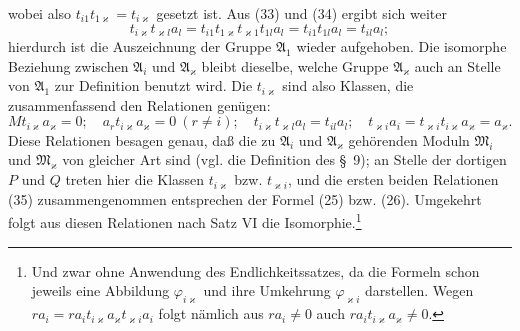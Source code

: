 \documentclass[11pt]{article}
\begin{document}
wobei also $t_{i1}t_{1\varkappa}=t_{i\varkappa}$ gesetzt ist. Aus (33) und (34) ergibt sich weiter
\[
 t_{i\varkappa}t_{\varkappa l}a_l=t_{i1}t_{1\varkappa}t_{\varkappa1}t_{1l}a_l
 =t_{i1}t_{1l}a_l=t_{il}a_l;
\]
hierdurch ist die Auszeichnung der Gruppe $\mathfrak A_1$ wieder aufgehoben. Die isomorphe Beziehung zwischen $\mathfrak A_i$ und $\mathfrak A_\varkappa$ bleibt dieselbe, welche Gruppe $\mathfrak A_\varkappa$ auch an Stelle von $\mathfrak A_1$ zur Definition benutzt wird. Die $t_{i\varkappa}$ sind also Klassen, die zusammenfassend den Relationen genügen:
\begin{equation}
 Mt_{i\varkappa}a_\varkappa=0;
 \quad a_rt_{i\varkappa}a_\varkappa=0\ (r\ne i);
 \quad t_{i\varkappa}t_{\varkappa l}a_l=t_{il}a_l;
 \quad t_{\varkappa i}a_i=t_{\varkappa i}t_{i\varkappa}a_\varkappa=a_\varkappa.
\tag{35}
\end{equation}
Diese Relationen besagen genau, daß die zu $\mathfrak A_i$ und $\mathfrak A_\varkappa$ gehörenden Moduln $\mathfrak M_i$ und $\mathfrak M_\varkappa$ von gleicher Art sind (vgl. die Definition des \S~9); an Stelle der dortigen $P$ und $Q$ treten hier die Klassen $t_{i\varkappa}$ bzw. $t_{\varkappa i}$, und die ersten beiden Relationen (35) zusammengenommen entsprechen der Formel (25) bzw. (26). Umgekehrt folgt aus diesen Relationen nach Satz VI die Isomorphie.\footnote{Und zwar ohne Anwendung des Endlichkeitssatzes, da die Formeln schon jeweils eine Abbildung $\varphi_{i\varkappa}$ und ihre Umkehrung $\varphi_{\varkappa i}$ darstellen. Wegen $ra_i=ra_it_{i\varkappa}a_\varkappa t_{\varkappa i}a_i$ folgt nämlich aus $ra_i\ne0$ auch $ra_it_{i\varkappa}a_\varkappa\ne0$.}
\end{document}
